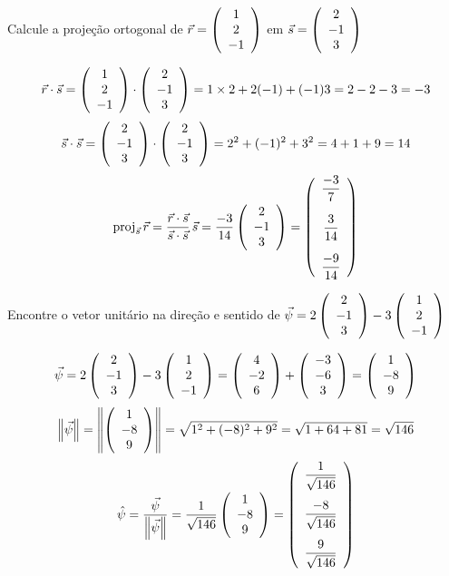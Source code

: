 \documentclass[a4paper,12pt,fleqn]{article}
\begin{document}
Calcule a projeção ortogonal de
\(
  \vec{r} = \left(\begin{array}{c} 1 \\ 2 \\ -1 \end{array}\right)
\)
em
\(
  \vec{s} = \left(\begin{array}{c} 2 \\ -1 \\ 3 \end{array}\right)
\)

\begin{answer}
  \[
    \vec{r}\cdot\vec{s}
    = \left(\begin{array}{c} 1 \\ 2 \\ -1 \end{array}\right) \cdot \left(\begin{array}{c} 2 \\ -1 \\ 3 \end{array}\right)
    = 1 \times 2 + 2(-1) + (-1)3
    = 2 - 2 - 3
    = -3
  \]
  \[
    \vec{s}\cdot\vec{s}
    = \left(\begin{array}{c} 2 \\ -1 \\ 3 \end{array}\right) \cdot \left(\begin{array}{c} 2 \\ -1 \\ 3 \end{array}\right)
    = 2^2 + (-1)^2 + 3^2
    = 4 + 1 + 9
    = 14
  \]
  \[
    \projuv{r}{s}
    = \frac{\vec{r}\cdot\vec{s}}{\vec{s}\cdot\vec{s}} \, \vec{s}
    = \frac{-3}{14} \vetortri{2}{-1}{3}
    = \Vetortri{\frac{-3}{7}}{\frac{3}{14}}{\frac{-9}{14}}
  \]
\end{answer}

Encontre o vetor unitário na direção e sentido de
\(
  \vec{\psi} = 2 \left(\begin{array}{c} 2 \\ -1 \\ 3 \end{array}\right) - 3 \left(\begin{array}{c} 1 \\ 2 \\ -1 \end{array}\right)
\)

\begin{answer}
  \[
    \vec{\psi}
    = 2\left(\begin{array}{c} 2 \\ -1 \\ 3 \end{array}\right) - 3\left(\begin{array}{c} 1 \\ 2 \\ -1 \end{array}\right)
    = \left(\begin{array}{c} 4 \\ -2 \\ 6 \end{array}\right) + \left(\begin{array}{c} -3 \\ -6 \\ 3 \end{array}\right)
    = \left(\begin{array}{c} 1 \\ -8 \\ 9 \end{array}\right)
  \]
  \[
    \norm{\vec{\psi}}
    = \norm{\vetortri{1}{-8}{9}}
    = \sqrt{1^2+(-8)^2+9^2}
    = \sqrt{1+64+81}
    = \sqrt{146}
  \]
  \[
    \hat{\psi}
    = \frac{\vec{\psi}}{\norm{\vec{\psi}}}
    = \frac{1}{\sqrt{146}} \vetortri{1}{-8}{9}
    = \Vetortri{\frac{1}{\sqrt{146}}}{\frac{-8}{\sqrt{146}}}{\frac{9}{\sqrt{146}}}
  \]
\end{answer}
\end{document}
